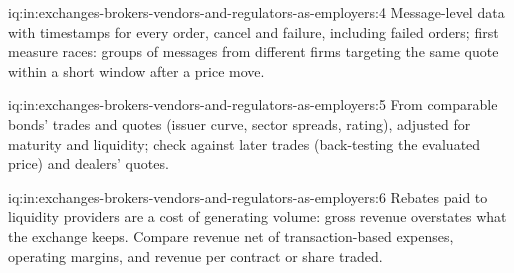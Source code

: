 \begin{solution}{iq:in:exchanges-brokers-vendors-and-regulators-as-employers:4}
Message-level data with timestamps for every order, cancel and failure, including failed orders; first measure races:
groups of messages from different firms targeting the same quote within a short window after a price move.
\end{solution}

\begin{solution}{iq:in:exchanges-brokers-vendors-and-regulators-as-employers:5}
From comparable bonds' trades and quotes (issuer curve, sector spreads, rating), adjusted for maturity and liquidity;
check against later trades (back-testing the evaluated price) and dealers' quotes.
\end{solution}

\begin{solution}{iq:in:exchanges-brokers-vendors-and-regulators-as-employers:6}
Rebates paid to liquidity providers are a cost of generating volume: gross revenue overstates what the exchange keeps.
Compare revenue net of transaction-based expenses, operating margins, and revenue per contract or share traded.
\end{solution}
